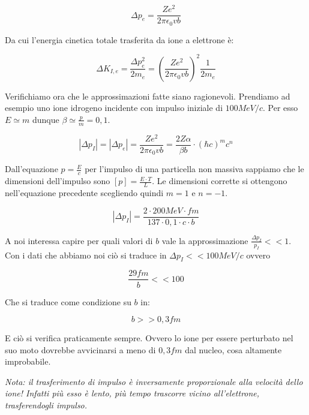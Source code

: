 \begin{equation}
\Delta p_e=\frac{Ze^2}{2\pi\epsilon_0vb}
\end{equation}

Da cui l'energia cinetica totale trasferita da ione a elettrone è:

\begin{equation}
\Delta K_{I,e}=\frac{\Delta p_e^2}{2m_e}=(\frac{Ze^2}{2\pi\epsilon_0vb})^2\frac{1}{2m_e}
\end{equation}

Verifichiamo ora che le approssimazioni fatte siano ragionevoli. Prendiamo ad esempio uno ione idrogeno incidente con impulso iniziale di $100 MeV/c$. Per esso $E\simeq m$ dunque $\beta\simeq\frac{p}{m}=0,1$.

\begin{equation}
 |\Delta p_I|=|\Delta p_e|=\frac{Ze^2}{2\pi\epsilon_0vb}=\frac{2Z\alpha}{\beta b}\cdot(\hbar c)^mc^n  
\end{equation}

Dall'equazione $p=\frac{E}{c}$ per l'impulso di una particella non massiva sappiamo che le dimensioni dell'impulso sono $[p]=\frac{E\cdot T}{L}$. Le dimensioni corrette si ottengono nell'equazione precedente scegliendo quindi $m=1$ e $n=-1$.

\begin{equation}
|\Delta p_I|=\frac{2\cdot 200 MeV\cdot fm}{137 \cdot 0,1 \cdot c \cdot b}
\end{equation}

A noi interessa capire per quali valori di $b$ vale la approssimazione $\frac{\Delta p_I}{p_I}<<1$. 
Con i dati che abbiamo noi ciò si traduce in $\Delta p_I<<100 MeV/c$ ovvero 

\begin{equation}
\frac{29 fm}{b}<<100
\end{equation}

Che si traduce come condizione su $b$ in:

\begin{equation}
b>>0,3 fm
\end{equation}

E ciò si verifica praticamente sempre. Ovvero lo ione per essere perturbato nel suo moto dovrebbe avvicinarsi a meno di $0,3 fm$ dal nucleo, cosa altamente improbabile.

\emph{Nota: il trasferimento di impulso è inversamente proporzionale alla velocità dello ione! Infatti più esso è lento, più tempo trascorre vicino all'elettrone, trasferendogli impulso.}

